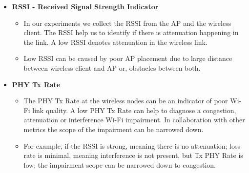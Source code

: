 \begin{itemize}
	\item \textbf{RSSI - Received Signal Strength Indicator}
	\begin{itemize}
		\item In our experiments we collect the RSSI from the AP and the wireless client. The RSSI help us to identify if there is attenuation happening in the link. A low RSSI denotes attenuation in the wireless link.
		\item Low RSSI can be caused by poor AP placement due to large distance between wireless client and AP or, obstacles between both.
	\end{itemize}
	
	\item \textbf{PHY Tx Rate}
	\begin{itemize}
		\item The PHY Tx Rate at the wireless nodes can be an indicator of poor Wi-Fi link quality. A low PHY Tx Rate can help to diagnose a congestion, attenuation or interference Wi-Fi impairment. In collaboration with other metrics the scope of the impairment can be narrowed down.
		\item For example, if the RSSI is strong, meaning there is no attenuation; loss rate is minimal, meaning interference is not present, but Tx PHY Rate is low; the impairment scope can be narrowed down to congestion.
	\end{itemize}
	

\end{itemize}
